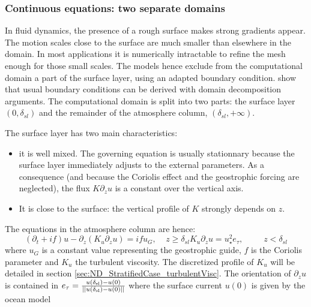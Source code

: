 \subsubsection{Continuous equations: two separate domains}
In fluid dynamics, the presence of a rough surface makes strong
gradients appear.
The motion scales close to the surface are much smaller than
elsewhere in the domain. In most applications it is numerically
intractable to refine the mesh enough for those small scales.
The models hence exclude from the computational domain
a part of the surface layer, using an adapted boundary
condition. \cite{mohammadi_rough_1998} show that usual boundary
conditions can be derived with domain decomposition arguments.
%
The computational domain is split into two parts:
the surface layer $(0,\delta_{sl})$ and the remainder of
the atmosphere column, $(\delta_{sl}, +\infty)$.
%
\par
The surface layer has two main characteristics:
\begin{itemize}
	\item it is well mixed. The governing equation
		is usually stationnary because the surface layer
		immediately adjusts to the external parameters.
		As a consequence (and because the Coriolis effect
		and the geostrophic forcing are neglected),
		the flux $K \partial_z u$
		is a constant over the vertical axis.
	\item It is close to the surface:
		the vertical profile of $K$ strongly depends 
		on $z$.
\end{itemize}
The equations in the atmosphere column are hence:
\begin{subequations}
	\begin{equation}
	\label{eq:ND_NeutralCase_EkmanEq}
  (\partial_t + if) u - \partial_z (K_u \partial_z u) = if u_G
		,~~~~~ z \geq \delta_{sl}
	\end{equation}
	\begin{equation}
	\label{eq:ND_NeutralCase_ConstantFlux}
	K_u \partial_z u
	= u_\star^2
	e_\tau, ~~~~~~~~~~~ z < \delta_{sl}
	\end{equation}
\end{subequations}
where $u_G$ is a constant value representing the geostrophic guide,
$f$ is the Coriolis parameter and $K_u$ the turbulent viscosity.
The discretized profile of $K_u$ will be
detailed in section \ref{sec:ND_StratifiedCase_turbulentVisc}.
The orientation of $\partial_z u$ is contained in
$e_\tau = \frac{u(\delta_{\rm sl})-u(0)}
	{||u(\delta_{\rm sl})-u(0)||}$
where the surface current $u(0)$ is given by the ocean model
